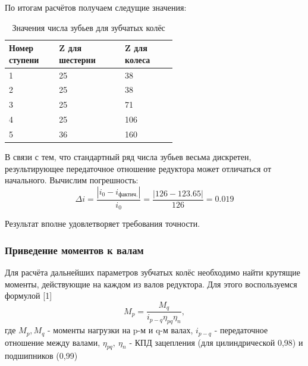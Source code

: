 \documentclass[14pt,a4paper,russian]{scrartcl}
\begin{document}
        По итогам расчётов получаем следущие значения:
        \begin{table}[h!]
            \begin{center}
                \begin{tabular}{p{0.13\linewidth}p{0.23\linewidth}p{0.2\linewidth}}
                    \hline
                    Номер ступени & Z для шестерни & Z для колеса \\
                    \hline
                    1   &   25 & 38 \\
                    2   &   25 & 38 \\
                    3   &   25 & 71 \\
                    4   &   25 & 106 \\
                    5   &   36 & 160 \\
                    \hline
                \end{tabular}
                \caption{Значения числа зубьев для зубчатых колёс}\label{tab:gears_z}
            \end{center}
        \end{table}
        
        В связи с тем, что стандартный ряд числа зубьев весьма дискретен, 
        результирующее передаточное отношение редуктора может отличаться от начального.
        Вычислим погрешность:
        \[ \Delta i = \frac{|i_0 - i_{\text{фактич.}}|}{i_0} =  
            \frac{|126-123.65|}{126} = 0.019\]
        
        Результат вполне удовлетворяет требования точности.
        
    \subsubsection{Приведение моментов к валам}
        Для расчёта дальнейших параметров зубчатых колёс необходимо найти крутящие моменты,
        действующие на каждом из валов редуктора. Для этого воспользуемся формулой [1]
        \[ M_p = \frac{M_q}{i_{p-q}\eta_{pq}\eta_n}, \]
        где \( M_p, M_q \) - моменты нагрузки на p-м и q-м валах,
            \( i_{p-q} \) - передаточное отношение между валами,
            \( \eta_{pq},\ \eta_n \) - КПД зацепления (для цилиндрической 0,98) и подшипников (0,99)\par
        
\end{document}
